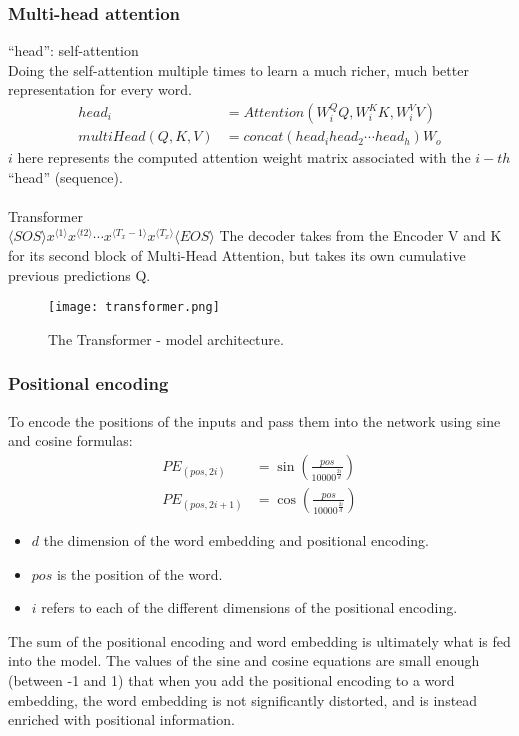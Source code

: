 \subsubsection{Multi-head attention}
``head'': self-attention\\
Doing the self-attention multiple times to learn a much richer, much better representation for every word.
\begin{align*}
head_i &= Attention(W_i^Q Q, W_i^K K, W_i^V V)\\
multiHead(Q, K, V) &= concat(head_i head_2 \cdots head_h)W_o
\end{align*}
$i$ here represents the computed attention weight matrix associated with the $i-th$ “head” (sequence).\\
\\
Transformer\\
$\langle SOS \rangle x^{\langle 1 \rangle} x^{\langle t2\rangle} \cdots x^{\langle T_x -1 \rangle} x^{\langle T_x \rangle} \langle EOS \rangle $
The decoder takes from the Encoder V and K for its second block of Multi-Head Attention, but takes its own cumulative previous predictions Q.

\begin{figure}[h]
    \centering
    \texttt{[image: transformer.png]}
    \caption{The Transformer - model architecture.}
    \label{fig:transformer}
\end{figure}

\subsubsection{Positional encoding}
To encode the positions of the inputs and pass them into the network using sine and cosine formulas:
\begin{align}
PE_{(pos, 2i)} &= \sin\left(\frac{pos}{{10000}^{\frac{2i}{d}}}\right)\\
PE_{(pos, 2i+1)} &= \cos\left(\frac{pos}{{10000}^{\frac{2i}{d}}}\right)
\end{align}
\begin{itemize}
\item
$d$ the dimension of the word embedding and positional encoding.
\item
$pos$ is the position of the word.
\item
$i$ refers to each of the different dimensions of the positional encoding.
\end{itemize}
The sum of the positional encoding and word embedding is ultimately what is fed into the model. The values of the sine and cosine equations are small enough (between -1 and 1) that when you add the positional encoding to a word embedding, the word embedding is not significantly distorted, and is instead enriched with positional information.

